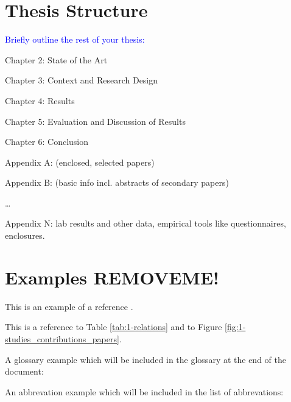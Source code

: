 \section{Thesis Structure}
\textcolor{blue}{Briefly outline the rest of your thesis:}

Chapter 2: State of the Art

Chapter 3: Context and Research Design

Chapter 4: Results

Chapter 5: Evaluation and Discussion of Results

Chapter 6: Conclusion

Appendix A: (enclosed, selected papers)

Appendix B: (basic info incl. abstracts of secondary papers)

\ldots

Appendix N: lab results and other data, empirical tools like questionnaires, enclosures. 



\section{Examples REMOVEME!}

This is an example of a reference \cite{copland2000}.

This is a reference to Table \ref{tab:1-relations} and to Figure \ref{fig:1-studies_contributions_papers}.

A glossary example which will be included in the glossary at the end of the document:

An abbrevation example which will be included in the list of abbrevations: 

